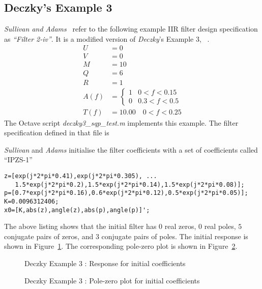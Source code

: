 \documentclass[a4paper,twoside,10pt,english]{report}
\begin{document}
\subsection{\label{sub:Deczkys-Example-3}Deczky's Example 3}
\emph{Sullivan and Adams}~\cite[p. 2859]{SullivanAdams_PCLS_IIRDigitalFilters}
refer to the following example IIR filter design specification as 
\emph{``Filter 2-iv''}. It is a modified version of \emph{Deczky}'s Example 3,
~\cite{Deczky_MinPSynthesisIIRDigitalFilters}.
\begin{align*}
U &= 0\\
V &= 0\\
M &= 10\\
Q &= 6\\
R &= 1\\
A\left(f\right) &= \begin{cases}
1 & 0<f<0.15\\
0 & 0.3<f<0.5
\end{cases}\\
T\left(f\right) &= 10.00\quad0<f<0.25
\end{align*}
The Octave script \emph{deczky3\_sqp\_test.m} implements this example. The
filter specification defined in that file is
\begin{small}

\end{small}
\emph{Sullivan} and \emph{Adams} 
initialise the filter coefficients with a set of coefficients called 
``IPZS-1''~\cite[IPZS-1, p. 2860]{SullivanAdams_PCLS_IIRDigitalFilters}
\begin{small}
\begin{verbatim}
z=[exp(j*2*pi*0.41),exp(j*2*pi*0.305), ...
   1.5*exp(j*2*pi*0.2),1.5*exp(j*2*pi*0.14),1.5*exp(j*2*pi*0.08)];
p=[0.7*exp(j*2*pi*0.16),0.6*exp(j*2*pi*0.12),0.5*exp(j*2*pi*0.05)];
K=0.0096312406;
x0=[K,abs(z),angle(z),abs(p),angle(p)]';
\end{verbatim}
\end{small}
The above listing shows that the initial filter has $0$ real zeros, $0$ real
poles, $5$ conjugate pairs of zeros, and $3$ conjugate pairs of poles. The
initial response is shown in Figure~\ref{fig:Deczky-Ex3-Initial-x0}. The
corresponding pole-zero plot is shown in
Figure~\ref{fig:Deczky-Ex3-Initial-x0-pz}.
\begin{figure}[!htbp]
\begin{center}
\scalebox{0.7}{}
\caption{Deczky Example 3 : Response for initial coefficients}
\label{fig:Deczky-Ex3-Initial-x0}
\end{center}
\end{figure}
\begin{figure}[!htbp]
\begin{center}
\scalebox{0.7}{}
\caption{Deczky Example 3 : Pole-zero plot for initial coefficients}
\label{fig:Deczky-Ex3-Initial-x0-pz}
\end{center}
\end{figure}
\end{document}
